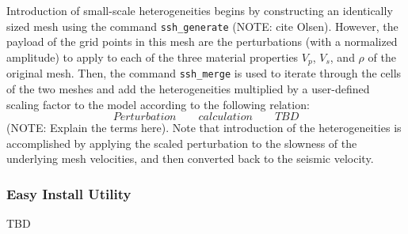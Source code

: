 Introduction of small-scale heterogeneities begins by constructing an identically sized mesh using the command \texttt{ssh\_generate} (NOTE: cite Olsen). However, the payload of the grid points in this mesh are the perturbations (with a normalized amplitude) to apply to each of the three material properties $V_p$, $V_s$, and $\rho$ of the original mesh. Then, the command \texttt{ssh\_merge} is used to iterate through the cells of the two meshes and add the heterogeneities multiplied by a user-defined scaling factor to the model according to the following relation:
\begin{equation}
Perturbation \qquad calculation \qquad TBD
\end{equation}
(NOTE: Explain the terms here). Note that introduction of the heterogeneities is accomplished by applying the scaled perturbation to the slowness of the underlying mesh velocities, and then converted back to the seismic velocity. 

\subsubsection{Easy Install Utility}
\label{sec:easy.install}

TBD
